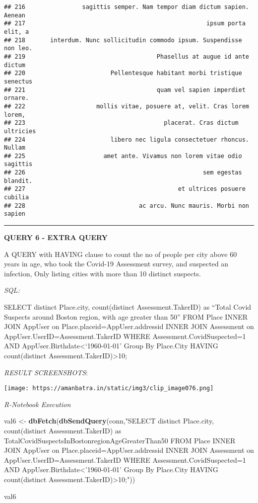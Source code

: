 \documentclass[
]{article}
\newenvironment{Shaded}{\begin{snugshade}}{\end{snugshade}}
\newcommand{\KeywordTok}[1]{\textcolor[rgb]{0.13,0.29,0.53}{\textbf{#1}}}
\newcommand{\NormalTok}[1]{#1}
\newcommand{\StringTok}[1]{\textcolor[rgb]{0.31,0.60,0.02}{#1}}
\begin{document}
\begin{verbatim}
## 216                sagittis semper. Nam tempor diam dictum sapien. Aenean
## 217                                                   ipsum porta elit, a
## 218       interdum. Nunc sollicitudin commodo ipsum. Suspendisse non leo.
## 219                                     Phasellus at augue id ante dictum
## 220                        Pellentesque habitant morbi tristique senectus
## 221                                     quam vel sapien imperdiet ornare.
## 222                    mollis vitae, posuere at, velit. Cras lorem lorem,
## 223                                       placerat. Cras dictum ultricies
## 224                        libero nec ligula consectetuer rhoncus. Nullam
## 225                      amet ante. Vivamus non lorem vitae odio sagittis
## 226                                                  sem egestas blandit.
## 227                                           et ultrices posuere cubilia
## 228                                ac arcu. Nunc mauris. Morbi non sapien
\end{verbatim}

\begin{center}\rule{0.5\linewidth}{0.5pt}\end{center}

\textbf{QUERY 6 - EXTRA QUERY}

A QUERY with HAVING clause to count the no of people per city above 60
years in age, who took the Covid-19 Assessment survey, and suspected an
infection, Only listing cities with more than 10 distinct suspects.

\emph{SQL:}

SELECT distinct Place.city, count(distinct Assessment.TakerID) as
``Total Covid Suspects around Boston region, with age greater than 50''
FROM Place INNER JOIN AppUser on Place.placeid=AppUser.addressid INNER
JOIN Assessment on AppUser.UserID=Assessment.TakerID WHERE
Assessment.CovidSuspected=1 AND AppUser.Birthdate\textless{}`1960-01-01'
Group By Place.City HAVING count(distinct
Assessment.TakerID)\textgreater10;

\emph{RESULT SCREENSHOTS}:

\texttt{[image: https://amanbatra.in/static/img3/clip\_image076.png]}

\emph{R-Notebook Execution}

\begin{Shaded}
\begin{Highlighting}[]
\NormalTok{val6 <-}\StringTok{ }\KeywordTok{dbFetch}\NormalTok{(}\KeywordTok{dbSendQuery}\NormalTok{(conn,}\StringTok{"SELECT distinct Place.city, }
\StringTok{count(distinct Assessment.TakerID) as TotalCovidSuspectsInBostonregionAgeGreaterThan50 }
\StringTok{FROM Place}
\StringTok{INNER JOIN AppUser on Place.placeid=AppUser.addressid}
\StringTok{INNER JOIN Assessment on AppUser.UserID=Assessment.TakerID}
\StringTok{WHERE Assessment.CovidSuspected=1 AND AppUser.Birthdate<'1960-01-01'}
\StringTok{Group By Place.City HAVING count(distinct Assessment.TakerID)>10;"}\NormalTok{))}

\NormalTok{val6}
\end{Highlighting}
\end{Shaded}
\end{document}
